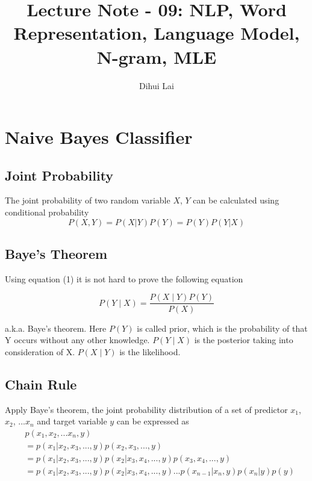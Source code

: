 \documentclass[12pt, oneside]{article}
\title{Lecture Note - 09: NLP, Word Representation, Language Model, N-gram, MLE}
\author{Dihui Lai}
\begin{document}
\maketitle
\tableofcontents

\vspace{.25in}

\section{Naive Bayes Classifier}

\subsection{Joint Probability }
The joint probability of two random variable $X$, $Y$ can be calculated using conditional probability 
\begin{equation}
P(X, Y)=P(X|Y)P(Y)=P(Y)P(Y|X)
\end{equation}

\subsection{Baye's Theorem}
Using equation (1) it is not hard to prove the following equation

\begin{equation}
P(Y\mid X)=\frac {P(X\mid Y)P(Y)}{P(X)}
\end{equation}

a.k.a. Baye's theorem. Here $P(Y)$ is called prior, which is the probability of that Y occurs without any other knowledge. $P(Y\mid X)$ is the posterior taking into consideration of X. $P(X\mid Y)$ is the likelihood.

\subsection{Chain Rule}
Apply Baye's theorem, the joint probability distribution of a set of predictor $x_1$, $x_2$, ...$x_n$ and target variable $y$ can be expressed as 
\begin{align*}
&p(x_1, x_2, ...x_n, y)\\
&=p(x_1|x_2, x_3, ..., y)p(x_2, x_3, ..., y)\\
&=p(x_1|x_2, x_3, ..., y)p(x_2|x_3, x_4, ..., y)p(x_3, x_4, ..., y)\\
&=p(x_1|x_2, x_3, ..., y)p(x_2|x_3, x_4, ..., y)...p(x_{n-1}|x_n, y)p(x_n|y)p(y)
\end{align*}
\end{document}
